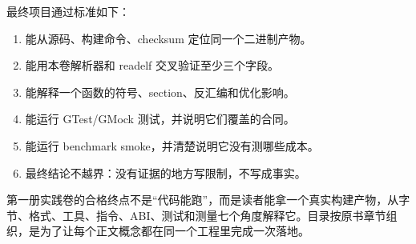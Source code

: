 
最终项目通过标准如下：

\begin{enumerate}
  \item 能从源码、构建命令、checksum 定位同一个二进制产物。
  \item 能用本卷解析器和 readelf 交叉验证至少三个字段。
  \item 能解释一个函数的符号、section、反汇编和优化影响。
  \item 能运行 GTest/GMock 测试，并说明它们覆盖的合同。
  \item 能运行 benchmark smoke，并清楚说明它没有测哪些成本。
  \item 最终结论不越界：没有证据的地方写限制，不写成事实。
\end{enumerate}

\begin{rubricbox}
第一册实践卷的合格终点不是“代码能跑”，而是读者能拿一个真实构建产物，从字节、格式、工具、指令、ABI、测试和测量七个角度解释它。目录按原书章节组织，是为了让每个正文概念都在同一个工程里完成一次落地。
\end{rubricbox}
